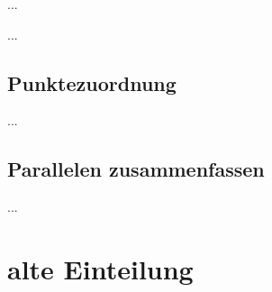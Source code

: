 \documentclass[../main/thesis.tex]{subfiles}
\begin{document}
...

%
%

...


\subsection{Punktezuordnung}

%
%

...


\subsection{Parallelen zusammenfassen}

%

...




\section{alte Einteilung}
\end{document}
